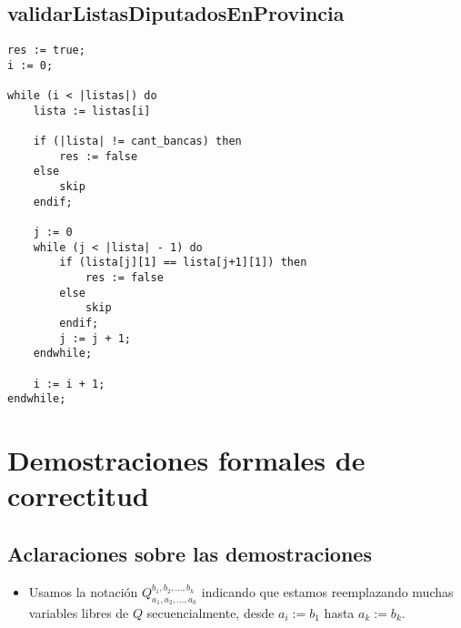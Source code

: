 \documentclass[10pt,a4paper]{article}
\begin{document}


\subsection{validarListasDiputadosEnProvincia}
\begin{minipage}[t]{\textwidth}
    \begin{lstlisting}[label=code:for]
res := true;
i := 0;

while (i < |listas|) do
    lista := listas[i]
    
    if (|lista| != cant_bancas) then
        res := false
    else
        skip
    endif;
    
    j := 0
    while (j < |lista| - 1) do
        if (lista[j][1] == lista[j+1][1]) then
            res := false
        else
            skip
        endif;
        j := j + 1;
    endwhile;
    
    i := i + 1;
endwhile;
    \end{lstlisting}
\end{minipage}

\section{Demostraciones formales de correctitud}
\subsection*{Aclaraciones sobre las demostraciones}
\begin{itemize}
    \item Usamos la notación $Q_{a_1, a_2, \ldots, a_k}^{b_1, b_2, \ldots, b_k}$ indicando que estamos reemplazando muchas variables libres de $Q$ secuencialmente, desde $a_i := b_1$ hasta $a_k := b_k$.
\end{itemize}
\end{document}
